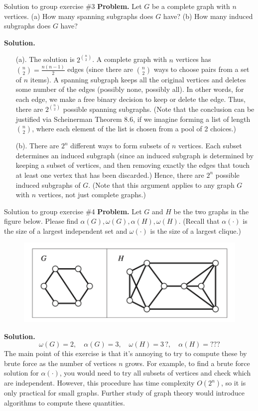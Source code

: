 \documentclass[10pt]{beamer}
\begin{document}
\begin{frame}{Solution to group exercise \#3}
\small 
\textbf{Problem.} Let $G$ be a complete graph with $n$ vertices.  (a) How many spanning subgraphs does $G$ have? (b) How many induced subgraphs does $G$ have?
\vfill

\textbf{Solution.}
\begin{itemize}
\item[(a).] The solution is $2^{\binom{n}{2}}$.  A complete graph with $n$ vertices has $\binom{n}{2}=\frac{n(n-1)}{2}$ edges (since there are $\binom{n}{2}$ ways to choose pairs from a set of $n$ items).  A spanning subgraph keeps all the original vertices and deletes some number of the edges (possibly none, possibly all).  In other words, for each edge, we make a free binary decision to keep or delete the edge.  Thus, there are $2^{\binom{n}{2}}$ possible spanning subgraphs.  (Note that the conclusion can be justified via Scheinerman Theorem 8.6, if we imagine forming a list of length $\binom{n}{2}$, where each element of the list is chosen from a pool of 2 choices.)
\item[(b).] There are $2^n$ different ways to form subsets of $n$ vertices.  Each subset determines an induced subgraph (since an induced subgraph is determined by keeping a subset of vertices, and then removing exactly the edges that touch at least one vertex that has been discarded.)  Hence, there are $2^n$ possible induced subgraphs of $G$. (Note that this argument applies to any graph $G$ with $n$ vertices, not just complete graphs.)
\end{itemize}

\end{frame}


\begin{frame}{Solution to group exercise \#4}
\small 
\textbf{Problem.}   Let $G$ and $H$ be the two graphs in the figure below.  Please find $\alpha(G), \omega(G), \alpha(H), \omega(H)$.  (Recall that $\alpha(\cdot)$ is the size of a largest independent set and $\omega(\cdot)$ is the size of a largest clique.) 
   
\begin{figure}
\includegraphics[width=.5\textwidth]{images/subgraph_2} %
\end{figure}
\vfill 
\textbf{Solution.}
%
\[ \omega(G)=2, \quad \alpha(G)=3, \quad  \omega(H)=3\,?, \quad  \alpha(H)=??? \]
%
The main point of this exercise is that it's annoying to try to compute these by brute force as the number of vertices $n$ grows. For example, to find a brute force solution for $\alpha(\cdot)$, you would need to try all subsets of vertices and check which are independent. However,  this procedure has time complexity $O(2^n)$, so it is only practical for small graphs.  Further study of graph theory would introduce algorithms to compute these quantities. 
\end{frame} 
\end{document}
